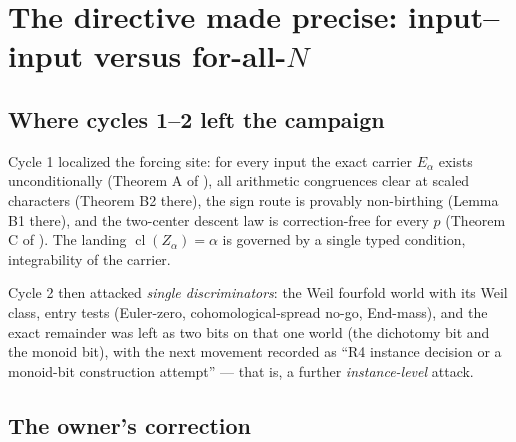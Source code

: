 \documentclass[11pt]{article}
\newcommand{\cl}{\operatorname{cl}}
\begin{document}
\tableofcontents

\section{The directive made precise: input--input versus for-all-\texorpdfstring{$N$}{N}}
\label{sec:directive}

\subsection{Where cycles 1--2 left the campaign}

Cycle 1 localized the forcing site: for every input the exact carrier
$E_\alpha$ exists unconditionally (Theorem A of
\cite{GST-forcing-site}), all arithmetic congruences clear at scaled
characters (Theorem B2 there), the sign route is provably non-birthing
(Lemma B1 there), and the two-center descent law is correction-free for every
$p$ (Theorem C of \cite{GST-gr25}).  The landing
$\cl(Z_\alpha)=\alpha$ is governed by a single typed condition,
integrability of the carrier.

Cycle 2 then attacked \emph{single discriminators}: the Weil fourfold world
with its Weil class, entry tests (Euler-zero, cohomological-spread no-go,
End-mass), and the exact remainder was left as two bits on that one world
(the dichotomy bit and the monoid bit), with the next movement recorded as
``R4 instance decision or a monoid-bit construction attempt'' --- that is, a
further \emph{instance-level} attack.

\subsection{The owner's correction}
\end{document}
